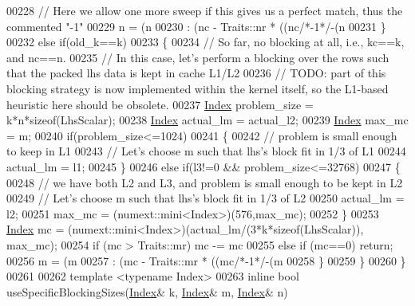 \begin{DoxyCode}
00228       \textcolor{comment}{//    Here we allow one more sweep if this gives us a perfect match, thus the commented "-1"}
00229       n = (n%
00230                     : (nc - Traits::nr * ((nc\textcolor{comment}{/*-1*/}-(n%
00231     \}
00232     \textcolor{keywordflow}{else} \textcolor{keywordflow}{if}(old\_k==k)
00233     \{
00234       \textcolor{comment}{// So far, no blocking at all, i.e., kc==k, and nc==n.}
00235       \textcolor{comment}{// In this case, let's perform a blocking over the rows such that the packed lhs data is kept in
       cache L1/L2}
00236       \textcolor{comment}{// TODO: part of this blocking strategy is now implemented within the kernel itself, so the L1-based
       heuristic here should be obsolete.}
00237       \hyperlink{namespace_eigen_a62e77e0933482dafde8fe197d9a2cfde}{Index} problem\_size = k*n*\textcolor{keyword}{sizeof}(LhsScalar);
00238       \hyperlink{namespace_eigen_a62e77e0933482dafde8fe197d9a2cfde}{Index} actual\_lm = actual\_l2;
00239       \hyperlink{namespace_eigen_a62e77e0933482dafde8fe197d9a2cfde}{Index} max\_mc = m;
00240       \textcolor{keywordflow}{if}(problem\_size<=1024)
00241       \{
00242         \textcolor{comment}{// problem is small enough to keep in L1}
00243         \textcolor{comment}{// Let's choose m such that lhs's block fit in 1/3 of L1}
00244         actual\_lm = l1;
00245       \}
00246       \textcolor{keywordflow}{else} \textcolor{keywordflow}{if}(l3!=0 && problem\_size<=32768)
00247       \{
00248         \textcolor{comment}{// we have both L2 and L3, and problem is small enough to be kept in L2}
00249         \textcolor{comment}{// Let's choose m such that lhs's block fit in 1/3 of L2}
00250         actual\_lm = l2;
00251         max\_mc = (numext::mini<Index>)(576,max\_mc);
00252       \}
00253       \hyperlink{namespace_eigen_a62e77e0933482dafde8fe197d9a2cfde}{Index} mc = (numext::mini<Index>)(actual\_lm/(3*k*\textcolor{keyword}{sizeof}(LhsScalar)), max\_mc);
00254       \textcolor{keywordflow}{if} (mc > Traits::mr) mc -= mc %
00255       \textcolor{keywordflow}{else} \textcolor{keywordflow}{if} (mc==0) \textcolor{keywordflow}{return};
00256       m = (m%
00257                     : (mc - Traits::mr * ((mc\textcolor{comment}{/*-1*/}-(m%
00258     \}
00259   \}
00260 \}
00261 
00262 \textcolor{keyword}{template} <\textcolor{keyword}{typename} Index>
00263 \textcolor{keyword}{inline} \textcolor{keywordtype}{bool} useSpecificBlockingSizes(\hyperlink{namespace_eigen_a62e77e0933482dafde8fe197d9a2cfde}{Index}& k, \hyperlink{namespace_eigen_a62e77e0933482dafde8fe197d9a2cfde}{Index}& m, \hyperlink{namespace_eigen_a62e77e0933482dafde8fe197d9a2cfde}{Index}& n)

\end{DoxyCode}
